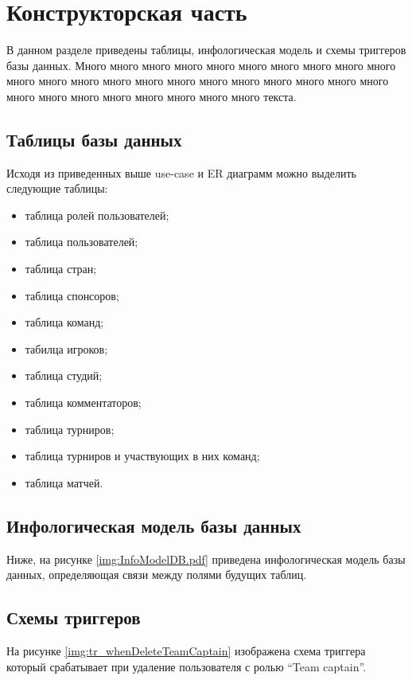 \chapter{Конструкторская часть}

В данном разделе приведены таблицы, инфологическая модель и схемы триггеров базы данных. Много много много много много много много много много много много много много много много много много много много много много много много много много много много много много много текста.

\section{Таблицы базы данных}
Исходя из приведенных выше use-case и ER диаграмм можно выделить следующие таблицы:

\begin{itemize}
	\item таблица ролей пользователей;
	\item таблица пользователей;
	\item таблица стран;
	\item таблица спонсоров;
	\item таблица команд;
	\item табилца игроков;
	\item таблица студий;
	\item таблица комментаторов;
	\item таблица турниров;
	\item таблица турниров и участвующих в них команд;
	\item таблица матчей.
\end{itemize}

\newpage
\section{Инфологическая модель базы данных}
Ниже, на рисунке \ref{img:InfoModelDB.pdf} приведена инфологическая модель базы данных, определяющая связи между полями будущих таблиц.


\newpage
\section{Схемы триггеров}
На рисунке \ref{img:tr_whenDeleteTeamCaptain} изображена схема триггера который срабатывает при удаление пользователя с ролью \textquotedblleft Team captain\textquotedblright.

